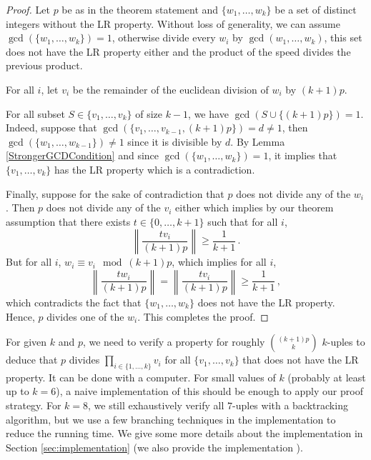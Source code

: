 \documentclass[11pt,a4paper]{article}
\theoremstyle{definition}
\theoremstyle{remark}
\begin{document}
\begin{proof}
Let $p$ be as in the theorem statement and $\{w_1, \ldots, w_k\}$ be a set of distinct integers without the LR property. Without loss of generality, we can assume $\gcd(\{w_1, \ldots, w_k\})=1$, otherwise divide every $w_i$ by $\gcd(w_1, \ldots, w_k)$, this set does not have the LR property either and the product of the speed divides the previous product.

For all $i$, let $v_i$ be the remainder of the euclidean division of $w_i$ by $(k+1)p$. 

For all subset $S\in \{v_1,\ldots, v_k\}$ of size $k-1$, we have $\gcd(S\cup\{(k+1)p\})=1$. Indeed, suppose that $\gcd(\{v_1,\ldots, v_{k-1},(k+1)p\})=d\not=1$, then $\gcd(\{w_1,\ldots, w_{k-1}\})\not=1$ since it is divisible by $d$. By Lemma \ref{StrongerGCDCondition} and since $\gcd(\{w_1, \ldots, w_k\})=1$, it implies that $\{v_1, \ldots, v_k\}$ has the LR property which is a contradiction.

Finally, suppose for the sake of contradiction that $p$ does not divide any of the $w_i$. Then $p$ does not divide any of the $v_i$ either which implies by our theorem assumption that there exists $t\in \{0,\ldots,k+1\}$ such that for all $i$,
\[
\left\|\frac{tv_i}{(k+1)p}\right\|\ge \frac{1}{k+1}\,.
\]
But for all $i$, $w_i\equiv v_i \mod (k+1)p$, which implies for all $i$,
\[
\left\|\frac{tw_i}{(k+1)p}\right\|=\left\|\frac{tv_i}{(k+1)p}\right\|\ge \frac{1}{k+1}\,,
\]
which contradicts the fact that  $\{w_1, \ldots, w_k\}$ does not have the LR property. Hence, $p$ divides one of the $w_i$. This completes the proof.
\end{proof}

For given $k$ and $p$, we need to verify a property for roughly $\binom{(k+1)p}{k}$ $k$-uples to deduce that $p$ divides $\prod_{i\in \{1,\ldots, k\}}v_i$ for all $\{v_1, \ldots, v_k\}$ that does not have the LR property. It can be done with a computer.
For small values of $k$ (probably at least up to $k=6$), a naive implementation of this should be enough to apply our proof strategy. For $k=8$, we still exhaustively verify all $7$-uples with a backtracking algorithm, but we use a few branching techniques in the implementation to reduce the running time. We give some more details about the implementation in Section \ref{sec:implementation} (we also provide the implementation \cite{gitRepo}). 
\end{document}
